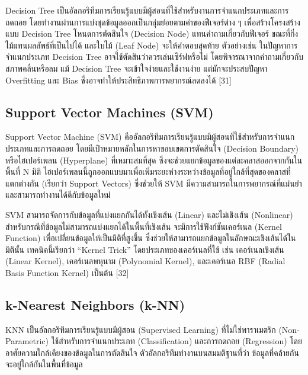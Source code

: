 \documentclass[12pt,oneside,openright,a4paper]{cpe-thai-project}
\begin{document}
\hspace{2em}Decision Tree เป็นอัลกอริทึมการเรียนรู้แบบมีผู้สอนที่ใช้สำหรับงานการจำแนกประเภทและการถดถอย โดยทำงานผ่านการแบ่งชุดข้อมูลออกเป็นกลุ่มย่อยตามค่าของฟีเจอร์ต่าง ๆ เพื่อสร้างโครงสร้างแบบ Decision Tree โหนดการตัดสินใจ (Decision Node) แทนคำถามเกี่ยวกับฟีเจอร์ ขณะที่กิ่งไม้แทนผลลัพธ์ที่เป็นไปได้ และใบไม้ (Leaf Node) จะให้คำตอบสุดท้าย ตัวอย่างเช่น ในปัญหาการจำแนกประเภท Decision Tree อาจใช้ตัดสินว่าควรเล่นเซิร์ฟหรือไม่ โดยพิจารณาจากคำถามเกี่ยวกับสภาพคลื่นหรือลม แม้ Decision Tree จะเข้าใจง่ายและใช้งานง่าย แต่มักจะประสบปัญหา Overfitting และ Bias ซึ่งอาจทำให้ประสิทธิภาพการพยากรณ์ลดลงได้ [31]

\subsection{Support Vector Machines (SVM)}

\hspace{2em}Support Vector Machine (SVM) คืออัลกอริทึมการเรียนรู้แบบมีผู้สอนที่ใช้สำหรับการจำแนกประเภทและการถดถอย โดยมีเป้าหมายหลักในการหาขอบเขตการตัดสินใจ (Decision Boundary) หรือไฮเปอร์เพลน (Hyperplane) ที่เหมาะสมที่สุด ซึ่งจะช่วยแยกข้อมูลของแต่ละคลาสออกจากกันในพื้นที่ N มิติ ไฮเปอร์เพลนนี้ถูกออกแบบมาเพื่อเพิ่มระยะห่างระหว่างข้อมูลที่อยู่ใกล้ที่สุดของคลาสที่แตกต่างกัน (เรียกว่า Support Vectors) ซึ่งช่วยให้ SVM มีความสามารถในการพยากรณ์ที่แม่นยำและสามารถทำงานได้ดีกับข้อมูลใหม่

\hspace{2em}SVM สามารถจัดการกับข้อมูลที่แบ่งแยกกันได้ทั้งเชิงเส้น (Linear) และไม่เชิงเส้น (Nonlinear) สำหรับกรณีที่ข้อมูลไม่สามารถแบ่งแยกได้ในพื้นที่เชิงเส้น จะมีการใช้ฟังก์ชันเคอร์เนล (Kernel Function) เพื่อเปลี่ยนข้อมูลให้เป็นมิติที่สูงขึ้น ซึ่งช่วยให้สามารถแยกข้อมูลในลักษณะเชิงเส้นได้ในมิตินั้น เทคนิคนี้เรียกว่า “Kernel Trick” โดยประเภทของเคอร์เนลที่ใช้ เช่น เคอร์เนลเชิงเส้น (Linear Kernel), เคอร์เนลพหุนาม (Polynomial Kernel), และเคอร์เนล RBF (Radial Basis Function Kernel) เป็นต้น [32]

\subsection{k-Nearest Neighbors (k-NN)}

\hspace{2em} KNN เป็นอัลกอริทึมการเรียนรู้แบบมีผู้สอน (Supervised Learning) ที่ไม่ใช่พาราเมตริก (Non-Parametric) ใช้สำหรับการจำแนกประเภท (Classification) และการถดถอย (Regression) โดยอาศัยความใกล้เคียงของข้อมูลในการตัดสินใจ ตัวอัลกอริทึมทำงานบนสมมติฐานที่ว่า ข้อมูลที่คล้ายกันจะอยู่ใกล้กันในพื้นที่ข้อมูล
\end{document}
